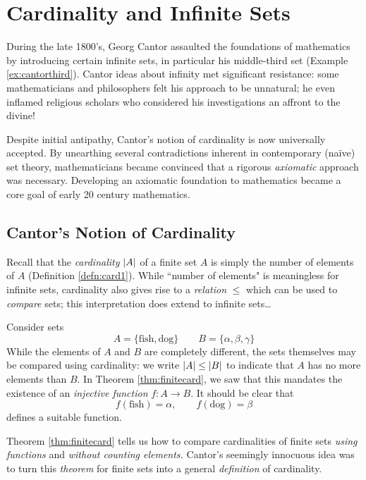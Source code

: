 \graphicspath{{8cardinality/asy/}}

\section{Cardinality and Infinite Sets}\label{chap:cantor}

During the late 1800's, Georg Cantor assaulted the foundations of mathematics by introducing certain infinite sets, in particular his middle-third set (Example \ref{ex:cantorthird}). Cantor ideas about infinity met significant resistance: some mathematicians and philosophers felt his approach to be unnatural; he even inflamed religious scholars who considered his investigations an affront to the divine!\smallbreak

Despite initial antipathy, Cantor's notion of cardinality is now universally accepted. By unearthing several contradictions inherent in contemporary (naïve) set theory, mathematicians became convinced that a rigorous \emph{axiomatic} approach was necessary. Developing an axiomatic foundation to mathematics became a core goal of early 20\th{} century mathematics.


\subsection{Cantor's Notion of Cardinality}\label{sec:cantor}

Recall that the \emph{cardinality} $\left| A\right|$ of a finite set $A$ is simply the number of elements of $A$ (Definition \ref{defn:card1}). While ``number of elements" is meaningless for infinite sets, cardinality also gives rise to a \emph{relation} $\le$ which can be used to \emph{compare} sets; this interpretation does extend to infinite sets\ldots

\begin{example}{}{}
	Consider sets
	\[
		A=\{\text{fish},\text{dog}\}\qquad B=\{\alpha,\beta,\gamma\}
	\]
	While the elements of $A$ and $B$ are completely different, the sets themselves may be compared using cardinality: we write $\left| A\right|\le \left| B\right|$ to indicate that $A$ has no more elements than $B$. In Theorem \ref{thm:finitecard}, we saw that this mandates the existence of an \emph{injective function} $f:A\to B$. It should be clear that
	\[
		f(\text{fish})=\alpha,\qquad f(\text{dog})=\beta
	\]
	defines a suitable function.
\end{example}

Theorem \ref{thm:finitecard} tells us how to compare cardinalities of finite sets \emph{using functions} and  \emph{without counting elements.} Cantor's seemingly innocuous idea was to turn this \emph{theorem} for finite sets into a general \emph{definition} of cardinality.


